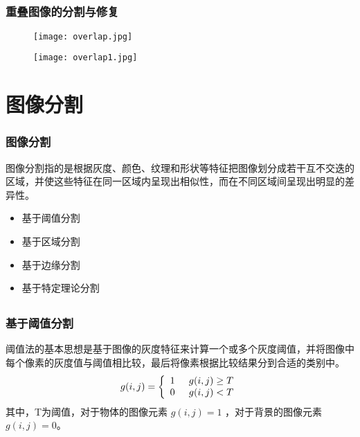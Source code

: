 \documentclass[notheorems,mathserif,table,compress]{beamer}  %
\begin{document}
\subsection{}
\begin{frame}
   \frametitle{重叠图像的分割与修复}
  \begin{figure}
  \begin{minipage}[l]{0.4\textwidth}
  \centering
  \texttt{[image: overlap.jpg]}
  \end{minipage}
  \begin{minipage}[r]{0.4\textwidth}
  \centering
  \texttt{[image: overlap1.jpg]}
  \end{minipage}
  \end{figure}
\end{frame}

\section{图像分割}
\begin{frame}
  \frametitle{图像分割}
\hspace{0.3in}图像分割指的是根据灰度、颜色、纹理和形状等特征把图像划分成若干互不交迭的区域，并使这些特征在同一区域内呈现出相似性，而在不同区域间呈现出明显的差异性。\\
  \begin{itemize}
  \item 基于阈值分割
  \item 基于区域分割
  \item 基于边缘分割
  \item 基于特定理论分割
  \end{itemize}
\end{frame}

\subsection{}
\begin{frame}
   \frametitle{基于阈值分割}
    \hspace{0.3in}阈值法的基本思想是基于图像的灰度特征来计算一个或多个灰度阈值，并将图像中每个像素的灰度值与阈值相比较，最后将像素根据比较结果分到合适的类别中。\\
    \begin{displaymath}
    g(i,j)=\left\{\begin{array}{ll}
    1\hspace{0.2in} g(i,j) \geq T\\
    0\hspace{0.2in} g(i,j) < T
    \end{array}\right.
    \end{displaymath}
    其中，T为阈值，对于物体的图像元素 $g(i,j)=1$ ，对于背景的图像元素 $g(i,j)=0$。
\end{frame}
\end{document}
